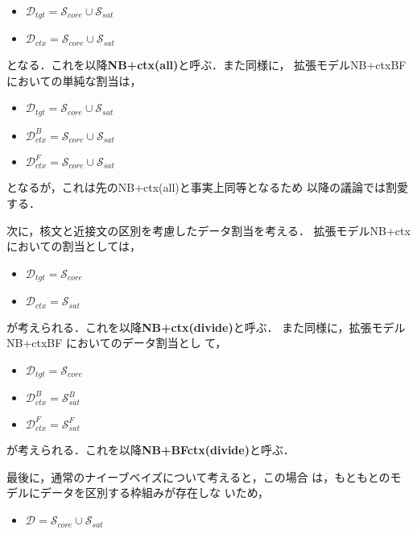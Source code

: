 \documentclass[japanese]{jnlp_1.4}
\begin{document}
\begin{itemize}
 \item $\mathcal{D}_{tgt} = \mathcal{S}_{core} \cup \mathcal{S}_{sat} $
 \item $\mathcal{D}_{ctx} = \mathcal{S}_{core} \cup \mathcal{S}_{sat} $
\end{itemize}

となる．これを以降\textbf{NB+ctx(all)}と呼ぶ．また同様に，
拡張モデルNB+ctxBF においての単純な割当は，

\begin{itemize}
 \item $\mathcal{D}_{tgt} = \mathcal{S}_{core} \cup \mathcal{S}_{sat} $
 \item $\mathcal{D}^{B}_{ctx} = \mathcal{S}_{core} \cup \mathcal{S}_{sat} $
 \item $\mathcal{D}^{F}_{ctx} = \mathcal{S}_{core} \cup \mathcal{S}_{sat} $
\end{itemize}

となるが，これは先のNB+ctx(all)と事実上同等となるため
以降の議論では割愛する．

次に，核文と近接文の区別を考慮したデータ割当を考える．
拡張モデルNB+ctx においての割当としては，

\begin{itemize}
 \item $\mathcal{D}_{tgt} = \mathcal{S}_{core}$
 \item $\mathcal{D}_{ctx} = \mathcal{S}_{sat} $
\end{itemize}

が考えられる．これを以降\textbf{NB+ctx(divide)}と呼ぶ．
また同様に，拡張モデルNB+ctxBF においてのデータ割当とし
て，

\begin{itemize}
 \item $\mathcal{D}_{tgt}     = \mathcal{S}_{core}$
 \item $\mathcal{D}^{B}_{ctx} = \mathcal{S}^{B}_{sat} $
 \item $\mathcal{D}^{F}_{ctx} = \mathcal{S}^{F}_{sat} $
\end{itemize}

が考えられる．これを以降\textbf{NB+BFctx(divide)}と呼ぶ．


最後に，通常のナイーブベイズについて考えると，この場合
は，もともとのモデルにデータを区別する枠組みが存在しな
いため，

\begin{itemize}
 \item $\mathcal{D} = \mathcal{S}_{core} \cup \mathcal{S}_{sat}$
\end{itemize}
\end{document}
